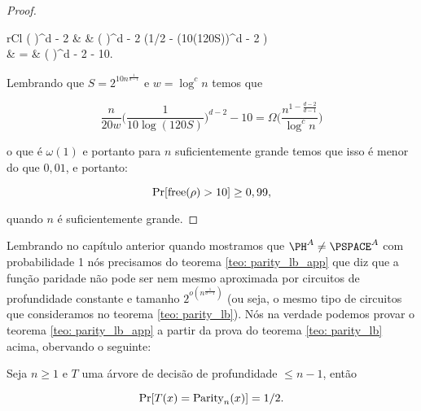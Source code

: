 \begin{proof}
	\begin{IEEEeqnarray*} {rCl}
		 \bigg( \bigg)^{d - 2} & \geq &  \bigg( \bigg)^{d - 2} \bigg(1/2 - (10\log(120S))^{d - 2} \bigg) \\
		                                                                                                                        & =    &  \bigg( \bigg)^{d - 2} - 10.
	\end{IEEEeqnarray*}
	
	Lembrando que $S = 2^{10n^{\frac{1}{d - 1}}}$ e $w = \log^{c}n$ temos que
	
	\begin{equation*}
		\frac{n}{20w} \bigg(\frac{1}{10\log(120S)} \bigg)^{d - 2} - 10 = \Omega \bigg( \frac{n^{1 - \frac{d - 2}{d - 1}}}{\log^{c}n} \bigg)
	\end{equation*}
	
	o que é $\omega(1)$ e portanto para $n$ suficientemente grande temos que isso é menor do que $0,01$, e portanto:
	
	\begin{equation*}
		\Pr[\text{free}(\rho) > 10] \geq 0,99,
	\end{equation*}
	
	quando $n$ é suficientemente grande.
	
\end{proof}

Lembrando no capítulo anterior quando mostramos que $\PH^{A} \neq \PSPACE^{A}$ com probabilidade 1 nós precisamos do teorema \ref{teo: parity_lb_app} que diz que a função paridade não pode ser nem mesmo aproximada por circuitos de profundidade constante e tamanho $2^{o(n^{\frac{1}{d - 1}})}$ (ou seja, o mesmo tipo de circuitos que consideramos no teorema \ref{teo: parity_lb}). Nós na verdade podemos provar o teorema \ref{teo: parity_lb_app} a partir da prova do teorema \ref{teo: parity_lb} acima, obervando o seguinte:

\begin{fato} \label{dt_parity_inapp}

Seja $n \geq 1$ e $T$ uma árvore de decisão de profundidade $\leq n - 1$, então

\begin{equation*}
	\Pr[T(x) = \text{Parity}_{n}(x)] = 1/2.
\end{equation*}

\end{fato}

